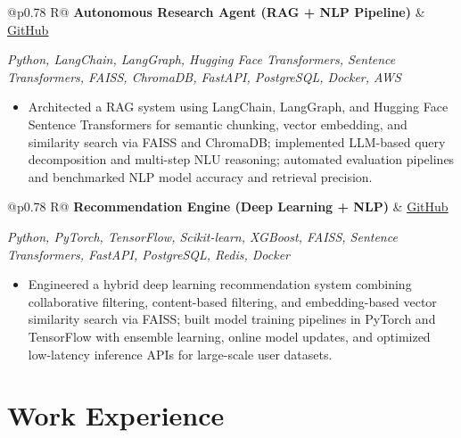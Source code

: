 \documentclass[a4paper,10pt]{article}
\newcommand{\ulink}[2]{\href{#1}{\uline{#2}}}
\newcommand{\subheading}[1]{{\color[HTML]{0A0A0A}\fontsize{12}{14}\selectfont\bfseries #1}}
\newcommand{\techstack}[1]{{\color[HTML]{5C5C5C}\fontsize{10.5}{12.5}\selectfont\itshape #1}}
\newcommand{\meta}[1]{{\color[HTML]{5C5C5C}\fontsize{10.5}{12.5}\selectfont #1}}
\begin{document}
\begin{tabularx}{\linewidth}{@{}p{0.78\linewidth} R@{}}
\subheading{Autonomous Research Agent (RAG + NLP Pipeline)} & \meta{\ulink{https://github.com/su-jin1425/Autonomous-Research-Agent}{GitHub}}
\end{tabularx}
\vspace{1pt}
\techstack{Python, LangChain, LangGraph, Hugging Face Transformers, Sentence Transformers, FAISS, ChromaDB, FastAPI, PostgreSQL, Docker, AWS}
\begin{itemize}[nosep, leftmargin=1.5em, itemsep=1pt, topsep=2pt]
\item {\color[HTML]{0A0A0A}\fontsize{11}{14}\selectfont
Architected a RAG system using LangChain, LangGraph, and Hugging Face Sentence Transformers for semantic chunking, vector embedding, and similarity search via FAISS and ChromaDB; implemented LLM-based query decomposition and multi-step NLU reasoning; automated evaluation pipelines and benchmarked NLP model accuracy and retrieval precision.}
\end{itemize}

\newpage

\vspace{2pt}

\begin{tabularx}{\linewidth}{@{}p{0.78\linewidth} R@{}}
\subheading{Recommendation Engine (Deep Learning + NLP)} & \meta{\ulink{https://github.com/su-jin1425/Recommendation-Engine}{GitHub}}
\end{tabularx}
\vspace{1pt}
\techstack{Python, PyTorch, TensorFlow, Scikit-learn, XGBoost, FAISS, Sentence Transformers, FastAPI, PostgreSQL, Redis, Docker}
\begin{itemize}[nosep, leftmargin=1.5em, itemsep=1pt, topsep=2pt]
\item {\color[HTML]{0A0A0A}\fontsize{11}{14}\selectfont
Engineered a hybrid deep learning recommendation system combining collaborative filtering, content-based filtering, and embedding-based vector similarity search via FAISS; built model training pipelines in PyTorch and TensorFlow with ensemble learning, online model updates, and optimized low-latency inference APIs for large-scale user datasets.}
\end{itemize}

\vspace{2pt}

\section{Work Experience}
\vspace{2pt}
\end{document}
